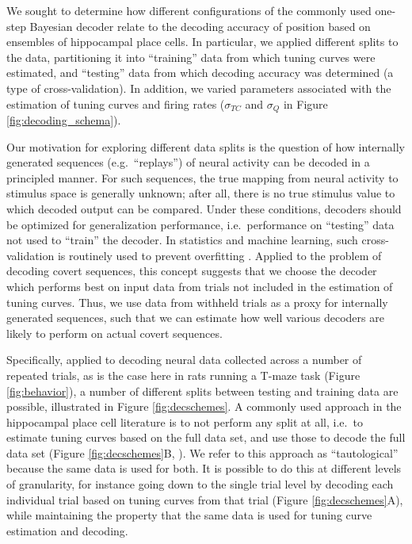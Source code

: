 \documentclass[11pt]{article}
\let\cite=\citep
\let\citeNP=\citealt
\begin{document}
We sought to determine how different configurations of the commonly
used one-step Bayesian decoder \cite{Brown1998,Zhang1998} relate to
the decoding accuracy of position based on ensembles of hippocampal
place cells. In particular, we applied different splits to the data,
partitioning it into ``training'' data from which tuning curves were
estimated, and ``testing'' data from which decoding accuracy was
determined (a type of cross-validation). In addition, we varied
parameters associated with the estimation of tuning curves and firing
rates ($\sigma_{TC}$ and $\sigma_Q$ in Figure
\ref{fig:decoding_schema}).

Our motivation for exploring different data splits is the question of
how internally generated sequences (e.g.\ ``replays'') of neural
activity can be decoded in a principled manner. For such sequences,
the true mapping from neural activity to stimulus space is generally
unknown; after all, there is no true stimulus value to which decoded
output can be compared. Under these conditions, decoders should be
optimized for generalization performance, i.e.\ performance on
``testing'' data not used to ``train'' the decoder. In statistics and
machine learning, such cross-validation is routinely used to prevent
overfitting \cite{Hawkins2004,alpaydin2014introduction}. Applied to
the problem of decoding covert sequences, this concept suggests that
we choose the decoder which performs best on input data from trials
not included in the estimation of tuning curves. Thus, we use data
from withheld trials as a proxy for internally generated sequences,
such that we can estimate how well various decoders are likely to
perform on actual covert sequences.

Specifically, applied to decoding neural data collected across a
number of repeated trials, as is the case here in rats running a
T-maze task (Figure \ref{fig:behavior}), a number of different splits
between testing and training data are possible, illustrated in Figure
\ref{fig:decschemes}. A commonly used approach in the hippocampal
place cell literature is to not perform any split at all, i.e.\ to
estimate tuning curves based on the full data set, and use those to
decode the full data set (Figure \ref{fig:decschemes}B,
\citeNP{johnson07jnsci,Karlsson2009,Pfeiffer2013,Zheng2016}). We refer
to this approach as ``tautological'' because the same data is used for
both. It is possible to do this at different levels of granularity,
for instance going down to the single trial level by decoding each
individual trial based on tuning curves from that trial (Figure
\ref{fig:decschemes}A), while maintaining the property that the same
data is used for tuning curve estimation and decoding.
\end{document}
